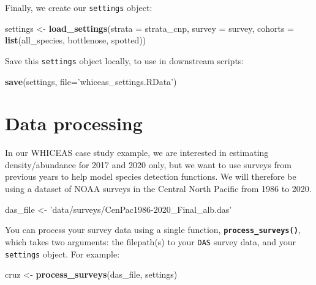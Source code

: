 \documentclass[
]{book}
\newenvironment{Shaded}{\begin{snugshade}}{\end{snugshade}}
\newcommand{\DataTypeTok}[1]{\textcolor[rgb]{0.13,0.29,0.53}{#1}}
\newcommand{\KeywordTok}[1]{\textcolor[rgb]{0.13,0.29,0.53}{\textbf{#1}}}
\newcommand{\NormalTok}[1]{#1}
\newcommand{\StringTok}[1]{\textcolor[rgb]{0.31,0.60,0.02}{#1}}
\begin{document}
Finally, we create our \texttt{settings} object:

\begin{Shaded}
\begin{Highlighting}[]
\NormalTok{settings <-}\StringTok{ }\KeywordTok{load_settings}\NormalTok{(}\DataTypeTok{strata =}\NormalTok{ strata_cnp,}
                          \DataTypeTok{survey =}\NormalTok{ survey,}
                          \DataTypeTok{cohorts =} \KeywordTok{list}\NormalTok{(all_species,}
\NormalTok{                                         bottlenose,}
\NormalTok{                                         spotted))}
\end{Highlighting}
\end{Shaded}

Save this \texttt{settings} object locally, to use in downstream scripts:

\begin{Shaded}
\begin{Highlighting}[]
\KeywordTok{save}\NormalTok{(settings, }\DataTypeTok{file=}\StringTok{'whiceas_settings.RData'}\NormalTok{)}
\end{Highlighting}
\end{Shaded}

\hypertarget{processing}{%
\chapter{Data processing}\label{processing}}

In our WHICEAS case study example, we are interested in estimating density/abundance for 2017 and 2020 only, but we want to use surveys from previous years to help model species detection functions. We will therefore be using a dataset of NOAA surveys in the Central North Pacific from 1986 to 2020.

\begin{Shaded}
\begin{Highlighting}[]
\NormalTok{das_file <-}\StringTok{ 'data/surveys/CenPac1986-2020_Final_alb.das'}
\end{Highlighting}
\end{Shaded}

You can process your survey data using a single function, \textbf{\texttt{process\_surveys()}}, which takes two arguments: the filepath(s) to your \texttt{DAS} survey data, and your \texttt{settings} object. For example:

\begin{Shaded}
\begin{Highlighting}[]
\NormalTok{cruz <-}\StringTok{ }\KeywordTok{process_surveys}\NormalTok{(das_file, settings)}
\end{Highlighting}
\end{Shaded}
\end{document}
